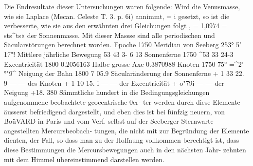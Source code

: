 \documentclass[12pt,a4paper]{article}
\begin{document}
Die Endresultate dieser Untersuchungen waren folgende:\newline
Wird die Venusmasse, wie sie Laplace (Mecan. Celeste T. 3. p. 6i) annimmt, = i gesetzt, so ist\newline
die verbesserte, wie sie aus den erwähnten drei Gleichungen folgt , = 1,0974 = sts\^{}ts« der Sonnenmasse.\newline
Mit dieser Massse sind alle periodischen und Säcularstörungen berechnet worden.\newline
Epoche 1750 Meridian von Seeberg 253° 5' 17"!\newline
Mittlere jährliche Bewegung 53 43 3- 6 13\newline
Sonnenferne 1750 \^{}53 33 24-3\newline
Excentricität 1800 0.2056163\newline
Halbe grosse Axe 0.3870988\newline
Knoten 1750 75° =\^{}2' °"9\^{}\newline
Neigung der Bahn 1800 7 05.9\newline
Säcularänderung der Sonnenferne + 1 33 22. 9\newline
--- --- des Knoten + 1 10 15. i\newline
--- --- der Excentricität + o"79i\newline
--- --- der Neigung +18. 380\newline
Sämmtliche hundert in die Bedingungsgleichungen aufgenommene beobachtete geocentrische 0er-\newline
ter werden durch diese Elemente äusserst befriedigend dargestellt, und eben dies ist bei fünfzig neuern,\newline
von BoüVARD in Paris und vom Verf. selbst auf der Seeberger Sternwarte angestellten Mercursbeobach-\newline
 tungen, die nicht mit zur Begründung der Elemente dienten, der Fall, so dass man zu der Hoffnung\newline
vollkommen berechtigt ist, dass diese Bestimmungen die Mercursbewegungen auch in den nächsten Jahr-\newline
zehnten mit dem Himmel übereinstimmend darstellen werden.\newline
\end{document}
